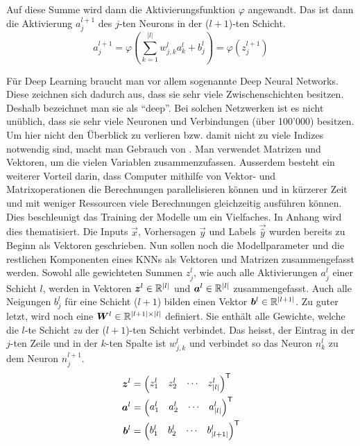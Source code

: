 Auf diese Summe wird dann die Aktivierungsfunktion $\varphi$ angewandt.
Das ist dann die Aktivierung $a_j^{l+1}$ des $j$-ten Neurons in der ($l+1$)-ten Schicht.
\\
\begin{equation}\tag{FP2}\label{eq:aktivierung_normal}
  a_j^{l+1} = \varphi\left(\sum_{k=1}^{|l|} w_{j,k}^l a_k^{l} + b_j^l \right) = \varphi \left( z_j^{l+1} \right)
\end{equation}
\par\bigskip
Für Deep Learning braucht man vor allem sogenannte Deep Neural Networks. Diese
zeichnen sich dadurch aus, dass sie sehr viele Zwischenschichten besitzen.
Deshalb bezeichnet man sie als ``deep''.
Bei solchen Netzwerken ist es nicht unüblich,
dass sie sehr viele Neuronen und Verbindungen (über 100'000) besitzen.
Um hier nicht den Überblick zu verlieren bzw. damit nicht zu viele Indizes notwendig
sind, macht man Gebrauch von . Man verwendet
Matrizen und Vektoren, um die vielen Variablen zusammenzufassen.
Ausserdem besteht ein weiterer Vorteil darin, dass Computer mithilfe von Vektor-
und Matrixoperationen die Berechnungen parallelisieren können und in kürzerer
Zeit und mit weniger Ressourcen viele Berechnungen gleichzeitig ausführen können.
Dies beschleunigt das Training der Modelle um
ein Vielfaches. In Anhang  wird dies thematisiert.
\para{}
Die Inputs $\vec{x}$, Vorhersagen $\vec{y}$ und Labels $\vec{\hat{y}}$ wurden
bereits zu Beginn als Vektoren geschrieben.
Nun sollen noch die Modellparameter und die restlichen Komponenten eines KNNs als Vektoren und Matrizen zusammengefasst werden.
Sowohl alle gewichteten Summen $z_j^l$, wie auch alle Aktivierungen $a_j^l$
einer Schicht $l$, werden in Vektoren $\bm{z}^l \in \mathbb{R}^{|l|}$ und
$\bm{a}^l \in \mathbb{R}^{|l|}$ zusammengefasst.
Auch alle Neigungen $b_j^l$ für eine Schicht ($l+1$) bilden einen Vektor
$\bm{b}^l \in \mathbb{R}^{|l+1|}$.
\para{}
Zu guter letzt, wird noch eine  $\bm{W}^l \in
\mathbb{R}^{|l+1| \times |l|}$
definiert. Sie enthält alle Gewichte, welche die $l$-te
Schicht \textit{zu} der ($l+1$)-ten Schicht verbindet.
Das heisst, der Eintrag in der $j$-ten Zeile und in
der $k$-ten Spalte ist $w_{j,k}^l$ und verbindet so das Neuron $n_k^{l}$ zu
dem Neuron $n_j^{l+1}$.
\\
\begin{align*}
  \bm{z}^l &=  \begin{pmatrix} z_1^l & z_2^l & \cdots & z_{|l|}^l \end{pmatrix}^{\mathsf{T}} \\
  \bm{a}^l &=  \begin{pmatrix} a_1^l & a_2^l & \cdots & a_{|l|}^l \end{pmatrix}^{\mathsf{T}} \\
  \bm{b}^l &=  \begin{pmatrix} b_1^l & b_2^l & \cdots & b_{|l+1|}^l \end{pmatrix}^{\mathsf{T}} \\
\end{align*}

